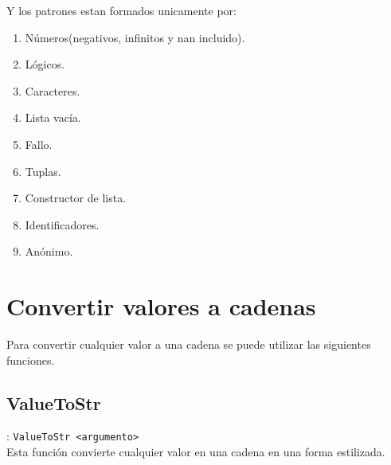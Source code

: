       Y los patrones estan formados unicamente por:
      
      \begin{enumerate}
         \item Números(negativos, infinitos y nan incluido).
         \item Lógicos.
         \item Caracteres.
         \item Lista vacía.
         \item Fallo.
         \item Tuplas.
         \item Constructor de lista.
         \item Identificadores.
         \item Anónimo.
      \end{enumerate}
      
   \section{Convertir valores a cadenas}
      Para convertir cualquier valor a una cadena se puede utilizar las siguientes funciones.
      
      \subsection*{ValueToStr}: \texttt{ValueToStr~<argumento>}\\
      Esta función convierte cualquier valor en una cadena en una forma estilizada.
      
      \begin{fxcode}
         \\
         \\
         \\
         \\
         \\
         \\
         \\
         \\
         \outcode{()}
      \end{fxcode}

